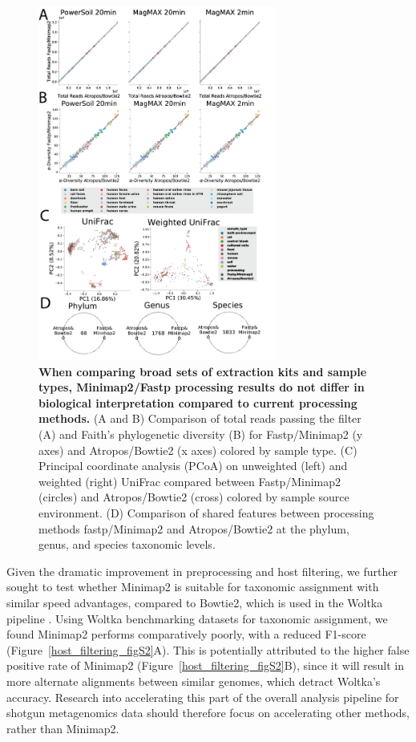 \begin{figure}[htbp]
\centering
\includegraphics[width=0.7\textwidth]{host-filtering-figures/figure02.png}
\caption[When comparing broad sets of extraction kits and sample types, Minimap2/Fastp processing results do not differ in biological interpretation compared to current processing methods.]{\textbf{When comparing broad sets of extraction kits and sample types, Minimap2/Fastp processing results do not differ in biological interpretation compared to current processing methods.}  (A and B) Comparison of total reads passing the filter (A) and Faith's phylogenetic diversity (B) for Fastp/Minimap2 (y axes) and Atropos/Bowtie2 (x axes) colored by sample type. (C) Principal coordinate analysis (PCoA) on unweighted (left) and weighted (right) UniFrac compared between Fastp/Minimap2 (circles) and Atropos/Bowtie2 (cross) colored by sample source environment. (D) Comparison of shared features between processing methods fastp/Minimap2 and Atropos/Bowtie2 at the phylum, genus, and species taxonomic levels.}
\label{host_filtering_fig2}
\end{figure}

Given the dramatic improvement in preprocessing and host filtering, we further sought to test whether Minimap2 is suitable for taxonomic assignment with similar speed advantages, compared to Bowtie2, which is used in the Woltka pipeline \cite{Zhu2021-ap}. Using Woltka benchmarking datasets for taxonomic assignment, we found Minimap2 performs  comparatively poorly, with a reduced F1-score (Figure~\ref{host_filtering_figS2}A). This is potentially attributed to the higher false positive rate of Minimap2 (Figure~\ref{host_filtering_figS2}B), since it will result in more alternate alignments between similar genomes, which detract Woltka's accuracy. Research into accelerating this part of the overall analysis pipeline for shotgun metagenomics data should therefore focus on accelerating other methods, rather than Minimap2.

